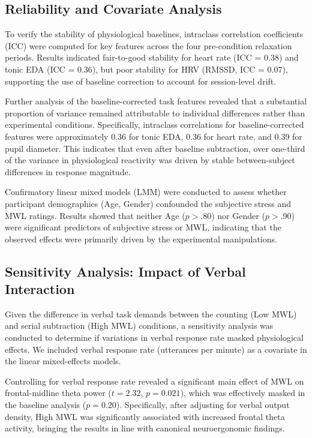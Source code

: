 \documentclass[lettersize,journal]{IEEEtran}
\begin{document}
\subsection{Reliability and Covariate Analysis}
To verify the stability of physiological baselines, intraclass correlation coefficients (ICC) were computed for key features across the four pre-condition relaxation periods. Results indicated fair-to-good stability for heart rate (ICC = 0.38) and tonic EDA (ICC = 0.36), but poor stability for HRV (RMSSD, ICC = 0.07), supporting the use of baseline correction to account for session-level drift.

Further analysis of the baseline-corrected task features revealed that a substantial proportion of variance remained attributable to individual differences rather than experimental conditions. Specifically, intraclass correlations for baseline-corrected features were approximately 0.36 for tonic EDA, 0.36 for heart rate, and 0.39 for pupil diameter. This indicates that even after baseline subtraction, over one-third of the variance in physiological reactivity was driven by stable between-subject differences in response magnitude.

Confirmatory linear mixed models (LMM) were conducted to assess whether participant demographics (Age, Gender) confounded the subjective stress and MWL ratings. Results showed that neither Age ($p > .80$) nor Gender ($p > .90$) were significant predictors of subjective stress or MWL, indicating that the observed effects were primarily driven by the experimental manipulations.

\subsection{Sensitivity Analysis: Impact of Verbal Interaction}
Given the difference in verbal task demands between the counting (Low MWL) and serial subtraction (High MWL) conditions, a sensitivity analysis was conducted to determine if variations in verbal response rate masked physiological effects. We included verbal response rate (utterances per minute) as a covariate in the linear mixed-effects models.

Controlling for verbal response rate revealed a significant main effect of MWL on frontal-midline theta power ($t=2.32$, $p=0.021$), which was effectively masked in the baseline analysis ($p=0.20$). Specifically, after adjusting for verbal output density, High MWL was significantly associated with increased frontal theta activity, bringing the results in line with canonical neuroergonomic findings. 
\end{document}
